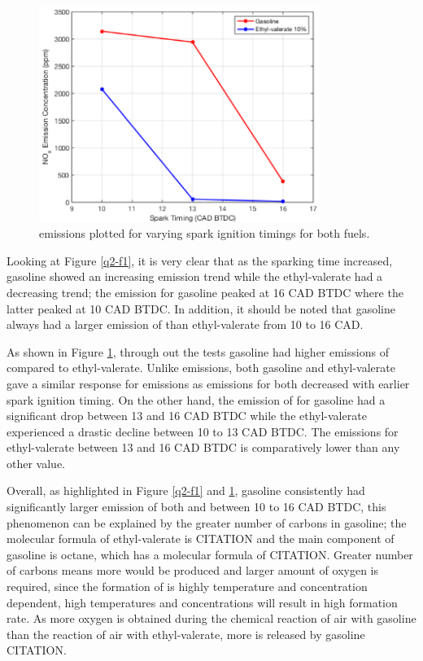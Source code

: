 \documentclass[11pt]{article}
\begin{document}
\begin{figure}[H]
    \centering
    \includegraphics[height = 7cm]{./img/diagram5.png}
    \caption{ emissions plotted for varying spark ignition timings for both fuels.}
    \label{q2-f2}
\end{figure}
Looking at Figure \ref{q2-f1}, it is very clear that as the sparking time increased, gasoline showed an increasing  emission trend while the ethyl-valerate had a decreasing trend; the  emission for gasoline peaked at 16 CAD BTDC where the latter peaked at 10 CAD BTDC. In addition, it should be noted that gasoline always had a larger emission of  than ethyl-valerate from 10 to 16 CAD. 

As shown in Figure \ref{q2-f2}, through out the tests gasoline had higher emissions of  compared to ethyl-valerate. Unlike  emissions, both gasoline and ethyl-valerate gave a similar response for  emissions as emissions for both decreased with earlier spark ignition timing. On the other hand, the emission of  for gasoline had a significant drop between 13 and 16 CAD BTDC while the ethyl-valerate experienced a drastic decline between 10 to 13 CAD BTDC. The  emissions for ethyl-valerate between 13 and 16 CAD BTDC is comparatively lower than any other value. 

Overall, as highlighted in Figure \ref{q2-f1} and \ref{q2-f2}, gasoline consistently had significantly larger emission of both  and   between 10 to 16 CAD BTDC, this phenomenon can be explained by the greater number of carbons in gasoline; the molecular formula of ethyl-valerate is  CITATION and the main component of gasoline is octane, which has a molecular formula of  CITATION. Greater number of carbons means more  would be produced and larger amount of oxygen is required, since the formation of  is highly temperature and  concentration dependent, high temperatures and  concentrations will result in high  formation rate. As more oxygen is obtained during the chemical reaction of air with gasoline than the reaction of air with ethyl-valerate, more  is released by gasoline CITATION.
\end{document}
